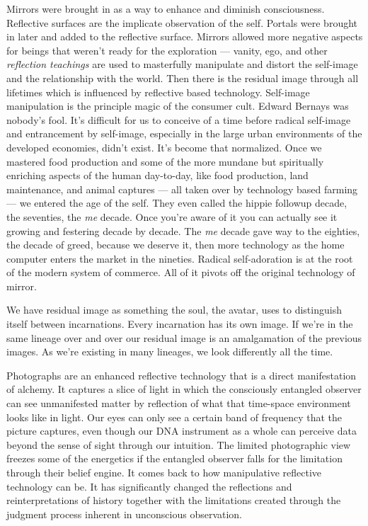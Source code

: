 Mirrors were brought in as a way to enhance and diminish consciousness.
Reflective surfaces are the implicate observation of the self. Portals
were brought in later and added to the reflective surface. Mirrors
allowed more negative aspects for beings that weren't ready for the
exploration --- vanity, ego, and other \emph{reflection teachings} are
used to masterfully manipulate and distort the self-image and the
relationship with the world. Then there is the residual image through
all lifetimes which is influenced by reflective based technology.
Self-image manipulation is the principle magic of the consumer cult.
Edward Bernays was nobody's fool. It's difficult for us to conceive of a
time before radical self-image and entrancement by self-image,
especially in the large urban environments of the developed economies,
didn't exist. It's become that normalized. Once we mastered food
production and some of the more mundane but spiritually enriching
aspects of the human day-to-day, like food production, land maintenance,
and animal captures --- all taken over by technology based farming ---
we entered the age of the self. They even called the hippie followup
decade, the seventies, the \emph{me} decade. Once you're aware of it you
can actually see it growing and festering decade by decade. The
\emph{me} decade gave way to the eighties, the decade of greed, because
we deserve it, then more technology as the home computer enters the
market in the nineties. Radical self-adoration is at the root of the
modern system of commerce. All of it pivots off the original technology
of mirror.

We have residual image as something the soul, the avatar, uses to
distinguish itself between incarnations. Every incarnation has its own
image. If we're in the same lineage over and over our residual image is
an amalgamation of the previous images. As we're existing in many
lineages, we look differently all the time.

Photographs are an enhanced reflective technology that is a direct
manifestation of alchemy. It captures a slice of light in which the
consciously entangled observer can see unmanifested matter by reflection
of what that time-space environment looks like in light. Our eyes can
only see a certain band of frequency that the picture captures, even
though our DNA instrument as a whole can perceive data beyond the sense
of sight through our intuition. The limited photographic view freezes
some of the energetics if the entangled observer falls for the
limitation through their belief engine. It comes back to how
manipulative reflective technology can be. It has significantly changed
the reflections and reinterpretations of history together with the
limitations created through the judgment process inherent in unconscious
observation.

